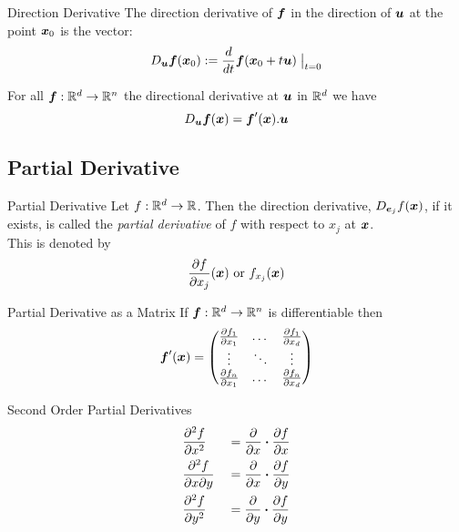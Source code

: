 \documentclass[11pt,a4paper]{article}
\begin{document}
\subtitle{Defintion 10.3 - }{Direction Derivative}
The direction derivative of $\boldsymbol{f}$ in the direction of $\boldsymbol{u}$ at the point $\boldsymbol{x}_0$ is the vector:
$$D_{\boldsymbol{u}}\boldsymbol{f}(\boldsymbol{x}_0) := \frac{d}{dt} \boldsymbol{f}(\boldsymbol{x}_0 + t\boldsymbol{u})\bigm|_{t=0}$$

\subtitle{Theorem 10.4}{}
For all $\boldsymbol{f} : \mathbb{R}^d \to \mathbb{R}^n$ the directional derivative at $\boldsymbol{u}$ in $\mathbb{R}^d$ we have
$$D_{\boldsymbol{u}} \boldsymbol{f} (\boldsymbol{x}) = \boldsymbol{f}'(\boldsymbol{x}).\boldsymbol{u}$$

\subsection{Partial Derivative}

\subtitle{Defintion 10.5 - }{Partial Derivative}
Let $f : \mathbb{R}^d \to \mathbb{R}$. Then the direction derivative, $D_{\boldsymbol{e}_j}f(\boldsymbol{x})$, if it exists, is called the \textit{partial derivative} of $f$ with respect to $x_j$ at $\boldsymbol{x}$.\\
This is denoted by $$\frac{\partial f}{\partial x_j}(\boldsymbol{x}) \mathrm{\ or\ } f_{x_j}(\boldsymbol{x})$$

\subtitle{Proposition 10.6 - }{Partial Derivative as a Matrix}
If $\boldsymbol{f} : \mathbb{R}^d \to \mathbb{R}^n$ is differentiable then
$$\boldsymbol{f}'(\boldsymbol{x}) = \begin{pmatrix}
\frac{\partial f_1}{\partial x_1} & \dots & \frac{\partial f_1}{\partial x_d} \\
\vdots & \ddots & \vdots \\
\frac{\partial f_n}{\partial x_1} & \dots & \frac{\partial f_n}{\partial x_d}
\end{pmatrix}$$

\subtitle{Remark 10.7 - }{Second Order Partial Derivatives}
\begin{alignat*}{2}
  &\frac{\partial^2 f}{\partial x^2} &&= \frac{\partial}{\partial x} \boldsymbol{\cdot} \frac{\partial f}{\partial x} \\
  &\frac{\partial^2 f}{\partial x \partial y} &&= \frac{\partial}{\partial x} \boldsymbol{\cdot} \frac{\partial f}{\partial y} \\
  &\frac{\partial^2 f}{\partial y^2} &&= \frac{\partial}{\partial y} \boldsymbol{\cdot} \frac{\partial f}{\partial y}
\end{alignat*}
\end{document}
